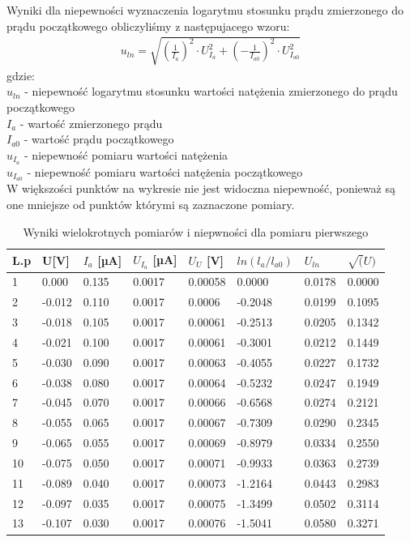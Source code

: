 \documentclass[a4paper]{article}
\newlength{\du}
\begin{document}
Wyniki dla niepewności wyznaczenia logarytmu stosunku prądu zmierzonego do prądu początkowego obliczyliśmy z następujacego wzoru:
\begin{align*}
u_{ln} = \sqrt{(\frac{1}{I_{a}})^2 \cdot U_{I_{a}}^2 + (- \frac{1}{I_{a0}})^2 \cdot U_{I_{a0}}^2 }
\end{align*}
gdzie:\\
$u_{ln}$ - niepewność logarytmu stosunku wartości natężenia zmierzonego do prądu początkowego \\
$I_{a}$ - wartość zmierzonego prądu\\
$I_{a0}$ - wartość prądu początkowego\\
$u_{I_{a}}$ - niepewność pomiaru wartości natężenia \\
$u_{I_{a0}}$ - niepewność pomiaru wartości natężenia początkowego \\

W większości punktów na wykresie nie jest widoczna niepewność, ponieważ są one mniejsze od punktów którymi są zaznaczone pomiary.


\begin{table}[h!]
\centering
 \begin{tabular}{ | l | l | l | l | l | l | l | l | }
 \hline
L.p & U[V] & $I_{a}$ [µA] & $U_{I_{a}}$ [µA] & $U_{U}$ [V] & $ln(l_{a}/l_{a0})$ & $U_{ln}$ & $\sqrt(U)$ \\ \hline
1 & 0.000 & 0.135 & 0.0017 & 0.00058 & 0.0000 & 0.0178 & 0.0000 \\ \hline
2 & -0.012 & 0.110 & 0.0017 & 0.0006 & -0.2048 & 0.0199 & 0.1095 \\ \hline
3 & -0.018 & 0.105 & 0.0017 & 0.00061 & -0.2513 & 0.0205 & 0.1342 \\ \hline
4 & -0.021 & 0.100 & 0.0017 & 0.00061 & -0.3001 & 0.0212 & 0.1449 \\ \hline
5 & -0.030 & 0.090 & 0.0017 & 0.00063 & -0.4055 & 0.0227 & 0.1732 \\ \hline
6 & -0.038 & 0.080 & 0.0017 & 0.00064 & -0.5232 & 0.0247 & 0.1949 \\ \hline
7 & -0.045 & 0.070 & 0.0017 & 0.00066 & -0.6568 & 0.0274 & 0.2121 \\ \hline
8 & -0.055 & 0.065 & 0.0017 & 0.00067 & -0.7309 & 0.0290 & 0.2345 \\ \hline
9 & -0.065 & 0.055 & 0.0017 & 0.00069 & -0.8979 & 0.0334 & 0.2550 \\ \hline
10 & -0.075 & 0.050 & 0.0017 & 0.00071 & -0.9933 & 0.0363 & 0.2739 \\ \hline
11 & -0.089 & 0.040 & 0.0017 & 0.00073 & -1.2164 & 0.0443 & 0.2983 \\ \hline
12 & -0.097 & 0.035 & 0.0017 & 0.00075 & -1.3499 & 0.0502 & 0.3114 \\ \hline
13 & -0.107 & 0.030 & 0.0017 & 0.00076 & -1.5041 & 0.0580 & 0.3271 \\ \hline
 \end{tabular}
\caption{Wyniki wielokrotnych pomiarów i niepwności dla pomiaru pierwszego}
\label{T1_pomiar}
\end{table}
\end{document}
